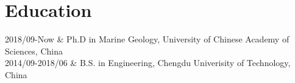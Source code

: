 \section{Education}

\begin{EntriesTable}{0.18}{0.02}{0.80}
2018/09-Now & Ph.D in Marine Geology, University of Chinese Academy of Sciences, China \\
2014/09-2018/06 & B.S. in Engineering, Chengdu Univerisity of Technology, China \\
\end{EntriesTable}

